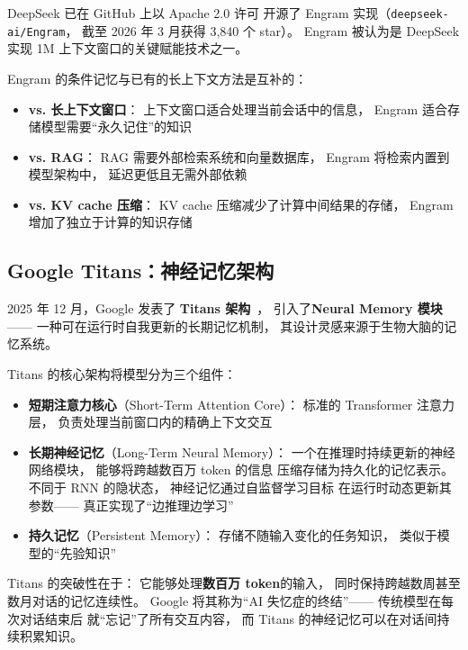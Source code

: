 DeepSeek 已在 GitHub 上以 Apache 2.0 许可
开源了 Engram 实现（\texttt{deepseek-ai/Engram}，
截至 2026 年 3 月获得 3,840 个 star）。
Engram 被认为是
DeepSeek 实现 1M 上下文窗口的关键赋能技术之一。

\begin{keybox}
Engram 的条件记忆与已有的长上下文方法是互补的：
\begin{itemize}[noitemsep]
  \item \textbf{vs. 长上下文窗口}：
        上下文窗口适合处理当前会话中的信息，
        Engram 适合存储模型需要“永久记住”的知识
  \item \textbf{vs. RAG}：
        RAG 需要外部检索系统和向量数据库，
        Engram 将检索内置到模型架构中，
        延迟更低且无需外部依赖
  \item \textbf{vs. KV cache 压缩}：
        KV cache 压缩减少了计算中间结果的存储，
        Engram 增加了独立于计算的知识存储
\end{itemize}
\end{keybox}

\subsection{Google Titans：神经记忆架构}

2025 年 12 月，Google 发表了
\textbf{Titans 架构}~\cite{titans2025}，
引入了\textbf{Neural Memory 模块}——
一种可在运行时自我更新的长期记忆机制，
其设计灵感来源于生物大脑的记忆系统。

Titans 的核心架构将模型分为三个组件：
\begin{itemize}[noitemsep]
  \item \textbf{短期注意力核心}（Short-Term Attention Core）：
        标准的 Transformer 注意力层，
        负责处理当前窗口内的精确上下文交互
  \item \textbf{长期神经记忆}（Long-Term Neural Memory）：
        一个在推理时持续更新的神经网络模块，
        能够将跨越数百万 token 的信息
        压缩存储为持久化的记忆表示。
        不同于 RNN 的隐状态，
        神经记忆通过自监督学习目标
        在运行时动态更新其参数——
        真正实现了“边推理边学习”
  \item \textbf{持久记忆}（Persistent Memory）：
        存储不随输入变化的任务知识，
        类似于模型的“先验知识”
\end{itemize}

Titans 的突破性在于：
它能够处理\textbf{数百万 token}的输入，
同时保持跨越数周甚至数月对话的记忆连续性。
Google 将其称为“AI 失忆症的终结”——
传统模型在每次对话结束后
就“忘记”了所有交互内容，
而 Titans 的神经记忆可以在对话间持续积累知识。

